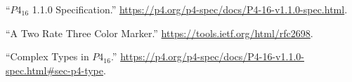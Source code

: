 \documentclass[11pt]{article}
\begin{document}
{%
{%
\begin{thebibliography}{35}%
\label{sec-bibliography}%

\mdbibitemlabel{{}[1]}\textquotedblleft{}$P4_{16}$ 1.1.0 Specification.\textquotedblright{} \href{https://p4.org/p4-spec/docs/P4-16-v1.1.0-spec.html}{{\ttfamily https://\hspace{0pt}p4.\hspace{0pt}org/\hspace{0pt}p4-\hspace{0pt}spec/\hspace{0pt}docs/\hspace{0pt}P4-\hspace{0pt}16-\hspace{0pt}v1.\hspace{0pt}1.\hspace{0pt}0-\hspace{0pt}spec.\hspace{0pt}html}}.\label{p4spec}%

\mdbibitemlabel{{}[2]}\textquotedblleft{}A Two Rate Three Color Marker.\textquotedblright{} \href{https://tools.ietf.org/html/rfc2698}{{\ttfamily https://\hspace{0pt}tools.\hspace{0pt}ietf.\hspace{0pt}org/\hspace{0pt}html/\hspace{0pt}rfc2698}}.\label{rfc2698}%

\mdbibitemlabel{{}[3]}\textquotedblleft{}Complex Types in $P4_{16}$.\textquotedblright{} \href{https://p4.org/p4-spec/docs/P4-16-v1.1.0-spec.html\%23sec-p4-type}{{\ttfamily https://\hspace{0pt}p4.\hspace{0pt}org/\hspace{0pt}p4-\hspace{0pt}spec/\hspace{0pt}docs/\hspace{0pt}P4-\hspace{0pt}16-\hspace{0pt}v1.\hspace{0pt}1.\hspace{0pt}0-\hspace{0pt}spec.\hspace{0pt}html\#\hspace{0pt}sec-\hspace{0pt}p4-\hspace{0pt}type}}.\label{p4complextypes}%


\end{thebibliography}}}
\end{document}
